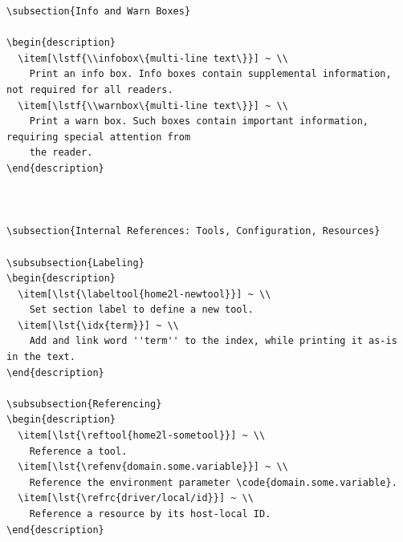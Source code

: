 \documentclass[12pt,english,parskip=half,headheight=19pt]{scrreprt}
\makeatletter
\renewenvironment{description}[1][8ex]
  {\list{}{\labelwidth=5ex \leftmargin=#1 \let\makelabel\descriptionlabel}}
  {\endlist}
\newcommand{\lst}[1]{\colorbox{lstbackground}{\footnotesize\code{#1}}}
\newcommand{\lstf}[1]{\colorbox{lstbackground}{\ttfamily\footnotesize#1}}
\newcommand{\infobox}[1]{
  \par
  \medskip
  \hfill
  \setlength\arrayrulewidth{1pt}
  \begin{tabular}[t]{c|c|}
    \parbox{1.8em}{\hfill\textit{\Huge\textbf{i}\,}}
    &
    \,\parbox{0.89\linewidth}{\setlength{\parskip}{0.5em} \small #1}\,
  \end{tabular}
  \medskip
  \par
}
\newcommand{\warnbox}[1]{
  \par
  \medskip
  \hfill
  \setlength\arrayrulewidth{1pt}
  \begin{tabular}[b]{c|c|}
    
    &
    \,\parbox{0.89\linewidth}{\setlength{\parskip}{0.5em}#1}\,
  \end{tabular}
  \medskip
  \par
}
\newcommand{\labeltool}[1]{\index{#1@\texttt{#1} (tool)} \label{tool:#1}}
\newcommand{\idx}[1]{#1\index{#1}}
\newcommand{\refenv}[1]{\hyperref[env:#1]{\texttt{#1}}}        %
\newcommand{\refrc}[1]{\hyperref[rc:#1]{\texttt{#1}}}
\newcommand{\reftool}[1]{\hyperref[tool:#1]{\texttt{\idx{#1}}}}
\makeatother
\begin{document}
\begin{description}
{\begin{lstlisting}[language=<language>]
\subsection{Info and Warn Boxes}

\begin{description}
  \item[\lstf{\\infobox\{multi-line text\}}] ~ \\
    Print an info box. Info boxes contain supplemental information, not required for all readers.
  \item[\lstf{\\warnbox\{multi-line text\}}] ~ \\
    Print a warn box. Such boxes contain important information, requiring special attention from
    the reader.
\end{description}



\subsection{Internal References: Tools, Configuration, Resources}

\subsubsection{Labeling}
\begin{description}
  \item[\lst{\labeltool{home2l-newtool}}] ~ \\
    Set section label to define a new tool.
  \item[\lst{\idx{term}}] ~ \\
    Add and link word ''term'' to the index, while printing it as-is in the text.
\end{description}

\subsubsection{Referencing}
\begin{description}
  \item[\lst{\reftool{home2l-sometool}}] ~ \\
    Reference a tool.
  \item[\lst{\refenv{domain.some.variable}}] ~ \\
    Reference the environment parameter \code{domain.some.variable}.
  \item[\lst{\refrc{driver/local/id}}] ~ \\
    Reference a resource by its host-local ID.
\end{description}




\end{lstlisting}}
\end{description}
\end{document}
